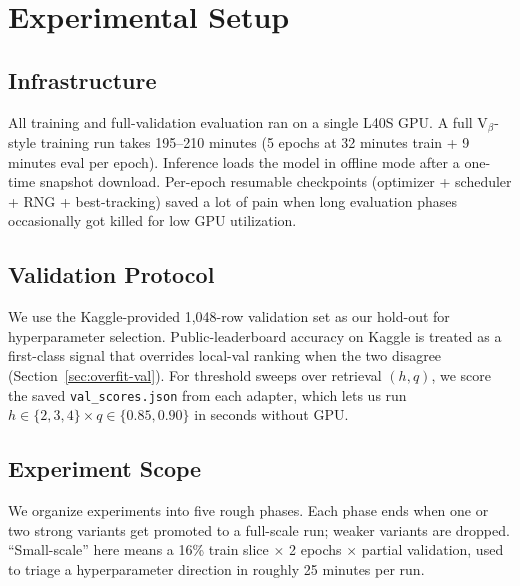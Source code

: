 \documentclass[11pt]{article}
\begin{document}
\section{Experimental Setup}

\subsection{Infrastructure}

All training and full-validation evaluation ran on a single L40S GPU. A full V$_\beta$-style training run takes 195--210 minutes (5 epochs at 32 minutes train + 9 minutes eval per epoch). Inference loads the model in offline mode after a one-time snapshot download. Per-epoch resumable checkpoints (optimizer + scheduler + RNG + best-tracking) saved a lot of pain when long evaluation phases occasionally got killed for low GPU utilization.

\subsection{Validation Protocol}

We use the Kaggle-provided 1{,}048-row validation set as our hold-out for hyperparameter selection. Public-leaderboard accuracy on Kaggle is treated as a first-class signal that overrides local-val ranking when the two disagree (Section~\ref{sec:overfit-val}). For threshold sweeps over retrieval $(h, q)$, we score the saved \texttt{val\_scores.json} from each adapter, which lets us run $h \in \{2, 3, 4\} \times q \in \{0.85, 0.90\}$ in seconds without GPU.

\subsection{Experiment Scope}

We organize experiments into five rough phases. Each phase ends when one or two strong variants get promoted to a full-scale run; weaker variants are dropped. ``Small-scale'' here means a 16\% train slice $\times$ 2 epochs $\times$ partial validation, used to triage a hyperparameter direction in roughly 25 minutes per run.
\end{document}
